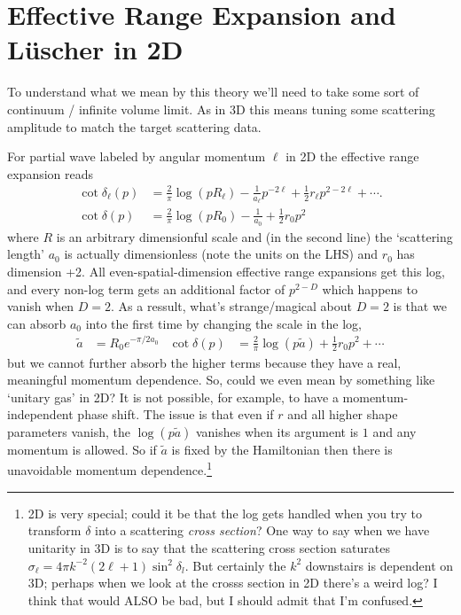 \section{Effective Range Expansion and L\"{u}scher in 2D}

To understand what we mean by this theory we'll need to take some sort of continuum / infinite volume limit.
As in 3D this means tuning some scattering amplitude to match the target scattering data.

For partial wave labeled by angular momentum $\ell$ in 2D the effective range expansion reads
\begin{align}
	\cot \delta_\ell(p)
	&=
			\frac{2}{\pi} \log(p R_\ell)
		-	\frac{1}{a_\ell} p^{-2\ell}
		+	\frac{1}{2} r_\ell p^{2-2\ell}
		+	\cdots.
	\\
	\cot \delta(p)
	&=
			\frac{2}{\pi} \log(p R_0)
		-	\frac{1}{a_0}
		+	\frac{1}{2} r_0 p^2
\end{align}
where $R$ is an arbitrary dimensionful scale and (in the second line) the `scattering length' $a_0$ is actually dimensionless (note the units on the LHS) and $r_0$ has dimension +2.
All even-spatial-dimension effective range expansions get this log, and every non-log term gets an additional factor of $p^{2-D}$ which happens to vanish when $D=2$.
As a ressult, what's strange/magical about $D=2$ is that we can absorb $a_0$ into the first time by changing the scale in the log,
\begin{align}
	\tilde{a} &= R_0 e^{-\pi/2a_0}
	&
	\cot \delta(p)
	&=
			\frac{2}{\pi} \log(p \tilde{a})
		+	\frac{1}{2} r_0 p^2
		+	\cdots
	\label{eq:no-constant}
\end{align}
but we cannot further absorb the higher terms because they have a real, meaningful momentum dependence.
So, could we even mean by something like `unitary gas' in 2D?
It is not possible, for example, to have a momentum-independent phase shift.
The issue is that even if $r$ and all higher shape parameters vanish, the $\log(p\tilde{a})$ vanishes when its argument is $1$ and any momentum is allowed.
So if $\tilde{a}$ is fixed by the Hamiltonian then there is unavoidable momentum dependence.\footnote{
	2D is very special; could it be that the log gets handled when you try to transform $\delta$ into a scattering \emph{cross section}?
	One way to say when we have unitarity in 3D is to say that the scattering cross section saturates $\sigma_\ell = 4\pi k^{-2} (2\ell+1) \sin^2 \delta_l$.
	But certainly the $k^2$ downstairs is dependent on 3D; perhaps when we look at the crosss section in 2D there's a weird log?
	I think that would ALSO be bad, but I should admit that I'm confused.
	}

